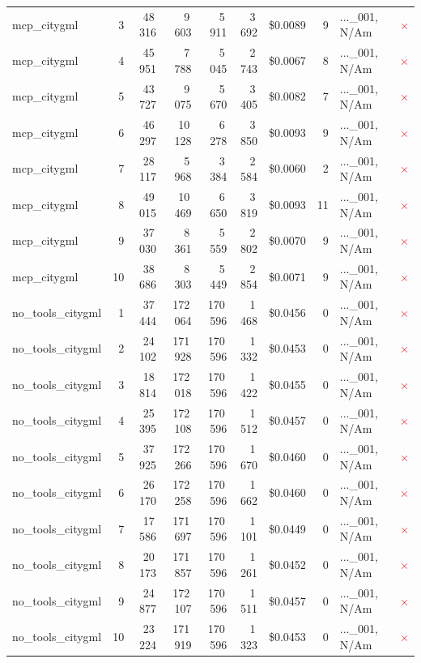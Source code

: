 \documentclass[a4paper,11pt]{article}
\begin{document}
\begin{table}[H]
{\begin{tabular}{l r r r r r r r l c}
mcp\_citygml & 3 & 48\,316 & 9\,603 & 5\,911 & 3\,692 & \$0.0089 & 9 & ...\_001, N/Am & \textcolor{red}{\(\times\)} \\
mcp\_citygml & 4 & 45\,951 & 7\,788 & 5\,045 & 2\,743 & \$0.0067 & 8 & ...\_001, N/Am & \textcolor{red}{\(\times\)} \\
mcp\_citygml & 5 & 43\,727 & 9\,075 & 5\,670 & 3\,405 & \$0.0082 & 7 & ...\_001, N/Am & \textcolor{red}{\(\times\)} \\
mcp\_citygml & 6 & 46\,297 & 10\,128 & 6\,278 & 3\,850 & \$0.0093 & 9 & ...\_001, N/Am & \textcolor{red}{\(\times\)} \\
mcp\_citygml & 7 & 28\,117 & 5\,968 & 3\,384 & 2\,584 & \$0.0060 & 2 & ...\_001, N/Am & \textcolor{red}{\(\times\)} \\
mcp\_citygml & 8 & 49\,015 & 10\,469 & 6\,650 & 3\,819 & \$0.0093 & 11 & ...\_001, N/Am & \textcolor{red}{\(\times\)} \\
mcp\_citygml & 9 & 37\,030 & 8\,361 & 5\,559 & 2\,802 & \$0.0070 & 9 & ...\_001, N/Am & \textcolor{red}{\(\times\)} \\
mcp\_citygml & 10 & 38\,686 & 8\,303 & 5\,449 & 2\,854 & \$0.0071 & 9 & ...\_001, N/Am & \textcolor{red}{\(\times\)} \\
\midrule
no\_tools\_citygml & 1 & 37\,444 & 172\,064 & 170\,596 & 1\,468 & \$0.0456 & 0 & ...\_001, N/Am & \textcolor{red}{\(\times\)} \\
no\_tools\_citygml & 2 & 24\,102 & 171\,928 & 170\,596 & 1\,332 & \$0.0453 & 0 & ...\_001, N/Am & \textcolor{red}{\(\times\)} \\
no\_tools\_citygml & 3 & 18\,814 & 172\,018 & 170\,596 & 1\,422 & \$0.0455 & 0 & ...\_001, N/Am & \textcolor{red}{\(\times\)} \\
no\_tools\_citygml & 4 & 25\,395 & 172\,108 & 170\,596 & 1\,512 & \$0.0457 & 0 & ...\_001, N/Am & \textcolor{red}{\(\times\)} \\
no\_tools\_citygml & 5 & 37\,925 & 172\,266 & 170\,596 & 1\,670 & \$0.0460 & 0 & ...\_001, N/Am & \textcolor{red}{\(\times\)} \\
no\_tools\_citygml & 6 & 26\,170 & 172\,258 & 170\,596 & 1\,662 & \$0.0460 & 0 & ...\_001, N/Am & \textcolor{red}{\(\times\)} \\
no\_tools\_citygml & 7 & 17\,586 & 171\,697 & 170\,596 & 1\,101 & \$0.0449 & 0 & ...\_001, N/Am & \textcolor{red}{\(\times\)} \\
no\_tools\_citygml & 8 & 20\,173 & 171\,857 & 170\,596 & 1\,261 & \$0.0452 & 0 & ...\_001, N/Am & \textcolor{red}{\(\times\)} \\
no\_tools\_citygml & 9 & 24\,877 & 172\,107 & 170\,596 & 1\,511 & \$0.0457 & 0 & ...\_001, N/Am & \textcolor{red}{\(\times\)} \\
no\_tools\_citygml & 10 & 23\,224 & 171\,919 & 170\,596 & 1\,323 & \$0.0453 & 0 & ...\_001, N/Am & \textcolor{red}{\(\times\)} \\
\bottomrule
\end{tabular}}
\end{table}
\end{document}

